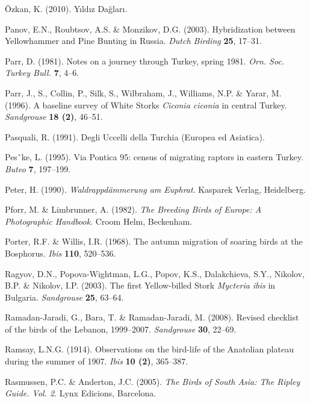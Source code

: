 \documentclass[
  a4paper,
  DIV=11,
  numbers=noendperiod]{scrreprt}
\newlength{\cslhangindent}
\newenvironment{CSLReferences}[2] %
 {\begin{list}{}{%
  \setlength{\itemindent}{0pt}
  \setlength{\leftmargin}{0pt}
  \setlength{\parsep}{0pt}
  \ifodd #1
   \setlength{\leftmargin}{\cslhangindent}
   \setlength{\itemindent}{-1\cslhangindent}
  \fi
  \setlength{\itemsep}{#2\baselineskip}}}
 {\end{list}}
\begin{document}
\begin{CSLReferences}{1}{1}
Özkan, K. (2010). {Yıldız Dağları}.

Panov, E.N., Roubtsov, A.S. \& Monzikov, D.G. (2003). {Hybridization
between Yellowhammer and Pine Bunting in Russia}. \emph{Dutch Birding}
\textbf{25}, 17--31.

Parr, D. (1981). {Notes on a journey through Turkey, spring 1981}.
\emph{Orn. Soc. Turkey Bull.} \textbf{7}, 4--6.

Parr, J., S., Collin, P., Silk, S., Wilbraham, J., Williams, N.P. \&
Yarar, M. (1996). {A baseline survey of White Storks \emph{Ciconia
ciconia} in central Turkey}. \emph{Sandgrouse} \textbf{18 (2)}, 46--51.

Pasquali, R. (1991). {Degli Uccelli della Turchia (Europea ed
Asiatica)}.

Pesˇke, L. (1995). {Via Pontica 95: census of migrating raptors in
eastern Turkey}. \emph{Buteo} \textbf{7}, 197--199.

Peter, H. (1990). \emph{{Waldrappdämmerung am Euphrat}}. Kasparek
Verlag, Heidelberg.

Pforr, M. \& Limbrunner, A. (1982). \emph{{The Breeding Birds of Europe:
A Photographic Handbook}}. Croom Helm, Beckenham.

Porter, R.F. \& Willis, I.R. (1968). {The autumn migration of soaring
birds at the Bosphorus}. \emph{Ibis} \textbf{110}, 520--536.

Ragyov, D.N., Popova-Wightman, L.G., Popov, K.S., Dalakchieva, S.Y.,
Nikolov, B.P. \& Nikolov, I.P. (2003). {The first Yellow-billed Stork
\emph{Mycteria ibis} in Bulgaria}. \emph{Sandgrouse} \textbf{25},
63--64.

Ramadan-Jaradi, G., Bara, T. \& Ramadan-Jaradi, M. (2008). {Revised
checklist of the birds of the Lebanon, 1999--2007}. \emph{Sandgrouse}
\textbf{30}, 22--69.

Ramsay, L.N.G. (1914). {Observations on the bird-life of the Anatolian
plateau during the summer of 1907}. \emph{Ibis} \textbf{10 (2)},
365--387.

Rasmussen, P.C. \& Anderton, J.C. (2005). \emph{{The Birds of South
Asia: The Ripley Guide. Vol. 2}}. Lynx Edicions, Barcelona.


\end{CSLReferences}
\end{document}
